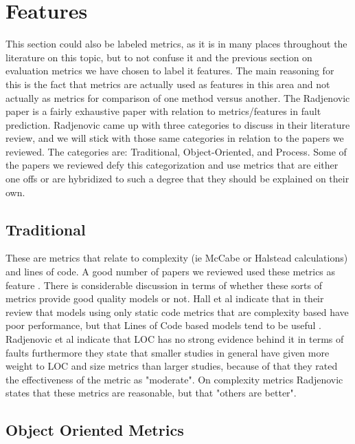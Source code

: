 \documentclass{sig-alternate-05-2015}
\begin{document}
\section{Features}

This section could also be labeled metrics, as it is in many places throughout the literature on this topic, but to not confuse it and the previous section on evaluation metrics we have chosen to label it features.  The main reasoning for this is the fact that metrics are actually used as features in this area and not actually as metrics for comparison of one method versus another.  The Radjenovic paper \cite{Radjenovic} is a fairly exhaustive paper with relation to metrics/features in fault prediction.  Radjenovic came up with three categories to discuss in their literature review, and we will stick with those same categories in relation to the papers we reviewed.  The categories are: Traditional, Object-Oriented, and Process.  Some of the papers we reviewed defy this categorization and use metrics that are either one offs or are hybridized to such a degree that they should be explained on their own.

\subsection{Traditional}

These are metrics that relate to complexity (ie McCabe or Halstead calculations) and lines of code.  A good number of papers we reviewed used these metrics as feature \cite{Posnett} \cite{Vandecruys} \cite{Bird}.  There is considerable discussion in terms of whether these sorts of metrics provide good quality models or not.  Hall et al indicate that in their review that models using only static code metrics that are complexity based have poor performance, but that Lines of Code based models tend to be useful \cite{Hall}.  Radjenovic et al indicate that LOC has no strong evidence behind it in terms of faults furthermore they state that smaller studies in general have given more weight to LOC and size metrics than larger studies, because of that they rated the effectiveness of the metric as "moderate"\cite{Radjenovic}.  On complexity metrics Radjenovic states that these metrics are reasonable, but that "others are better"\cite{Radjenovic}.  

\subsection{Object Oriented Metrics}
\end{document}
